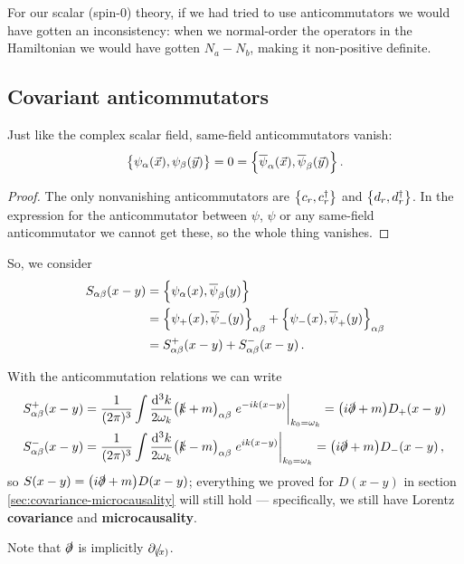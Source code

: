 \documentclass[main.tex]{subfiles}
\begin{document}
For our scalar (spin-0) theory, if we had tried to use anticommutators we would have gotten an inconsistency: when we normal-order the operators in the Hamiltonian we would have gotten \(N_a - N_b\), making it non-positive definite. 

\subsection{Covariant anticommutators}

\begin{claim}
Just like the complex scalar field, same-field anticommutators vanish: 
%
\begin{align}
\qty{\psi_{\alpha }(\vec{x}), \psi_{\beta }(\vec{y})} = 0 = \qty{\overline{\psi}_{\alpha }(\vec{x}), \overline{\psi}_{\beta }(\vec{y})}
\,.
\end{align}
\end{claim}

\begin{proof}
The only nonvanishing anticommutators are \(\qty{c_r , c_r ^\dag}\) and \(\qty{d_r, d_r ^\dag}\). In the expression for the anticommutator between \(\psi \), \(\psi \) or any same-field anticommutator we cannot get these, so the whole thing vanishes. 
\end{proof}

So, we consider 
%
\begin{subequations}
\begin{align}
S_{\alpha \beta } (x-y) &= \qty{ \psi_{\alpha }(x), \overline{\psi}_{\beta }(y)}  \\
&= \qty{\psi_{+}(x), \overline{\psi}_{-}(y)}_{\alpha \beta } + 
\qty{\psi_{-}(x), \overline{\psi}_{+}(y)}_{\alpha \beta }  \\
&= S_{\alpha \beta }^{+}(x-y) + S_{\alpha \beta }^{-} (x-y)
\,.
\end{align}
\end{subequations}

With the anticommutation relations we can write 
%
\begin{subequations}
\begin{align}
S^{+}_{\alpha \beta }(x-y) &= \frac{1}{(2 \pi )^3}
\int \frac{ \dd[3]{k}}{2 \omega_{k}}
\qty(\slashed{k} + m)_{\alpha \beta } \eval{e^{-ik(x-y)} }_{k_0 = \omega_{k}} = \qty(i \slashed{\partial} + m) D_+ (x-y)\\
S^{-}_{\alpha \beta }(x-y) &= \frac{1}{(2 \pi )^3}
\int \frac{ \dd[3]{k}}{2 \omega_{k}}
\qty(\slashed{k} - m)_{\alpha \beta } \eval{e^{ik(x-y)} }_{k_0 = \omega_{k}}
=\qty(i \slashed{\partial} + m) D_- (x-y)
\,,
\end{align}
\end{subequations}
%
so \(S(x-y) = \qty(i \slashed{\partial} + m )D(x-y) \); everything we proved for \(D(x-y)\) in section \ref{sec:covariance-microcausality} will still hold --- specifically, we still have Lorentz \textbf{covariance} and \textbf{microcausality}. 

Note that \(\slashed{\partial}\) is implicitly \(\slashed{\partial_{(x)}}\). 
\end{document}
